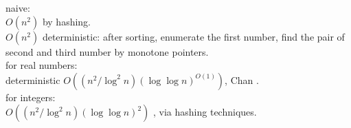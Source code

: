 \documentclass{article}
\newcommand{\Acknowledgements}[1]{\ \\{\bf Acknowledgements:} #1}
\begin{document}
naive:\\
$O(n^2)$ by hashing.\\
$O(n^2)$ deterministic: after sorting, enumerate the first number, find the pair of second and third number by monotone pointers.\\


for real numbers:\\
deterministic $O((n^2/\log^2 n)(\log\log n)^{O(1)})$, Chan \cite{chan2018more}.\\

for integers:\\
$O((n^2/\log^2 n)(\log\log n)^2)$ \cite{baran2008subquadratic}, via hashing techniques.\\






\end{document}
